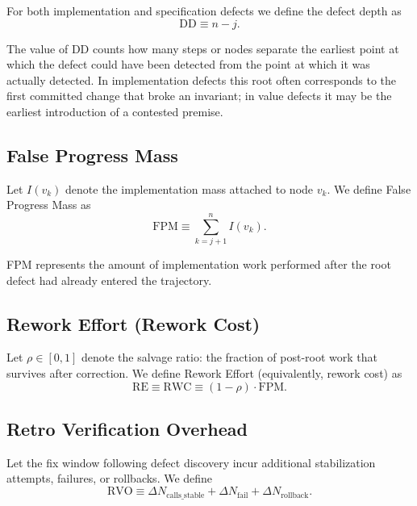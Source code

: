 \documentclass[twocolumn]{aastex701}
\begin{document}
For both implementation and specification defects we define the defect depth as
\begin{equation}
\mathrm{DD} \equiv n-j.
\end{equation}

The value of $\mathrm{DD}$ counts how many steps or nodes separate
the earliest point at which the defect could have been detected from
the point at which it was actually detected.
In implementation defects this root often corresponds to the first
committed change that broke an invariant; in value defects it may be the
earliest introduction of a contested premise.

\subsection{False Progress Mass}

Let $I(v_k)$ denote the implementation mass attached to node $v_k$.
We define False Progress Mass as
\begin{equation}
\mathrm{FPM} \equiv \sum_{k=j+1}^{n} I(v_k).
\end{equation}

FPM represents the amount of implementation work performed
after the root defect had already entered the trajectory.

\subsection{Rework Effort (Rework Cost)}

Let $\rho \in [0,1]$ denote the salvage ratio:
the fraction of post-root work that survives after correction.
We define Rework Effort (equivalently, rework cost) as
\begin{equation}
\mathrm{RE} \equiv \mathrm{RWC} \equiv (1-\rho)\cdot \mathrm{FPM}.
\end{equation}

\subsection{Retro Verification Overhead}

Let the fix window following defect discovery incur additional
stabilization attempts, failures, or rollbacks.
We define
\begin{equation}
\mathrm{RVO} \equiv
\Delta N_{\mathrm{calls\_stable}} +
\Delta N_{\mathrm{fail}} +
\Delta N_{\mathrm{rollback}}.
\end{equation}
\end{document}
